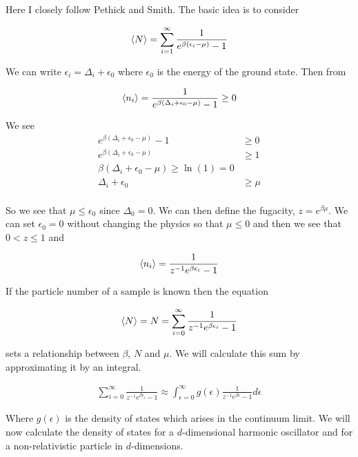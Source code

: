 \documentclass[12pt]{article}
\newcommand{\ep}{\epsilon}
\begin{document}
Here I closely follow Pethick and Smith. The basic idea is to consider

\begin{align}
\Braket{N} = \sum_{i=1}^{\infty} \frac{1}{e^{\beta(\ep_i-\mu)}-1}
\end{align}

We can write $\ep_i = \Delta_i + \ep_0$ where $\ep_0$ is the energy of the ground state. Then from

\begin{align}
\braket{n_i} = \frac{1}{e^{\beta(\Delta_i + \ep_0 - \mu)}-1} \ge 0
\end{align}

We see 
\begin{align}
e^{\beta(\Delta_i+\ep_0-\mu)}-1 &\ge 0\\
e^{\beta(\Delta_i+\ep_0-\mu)} &\ge 1\\
\beta(\Delta_i+\ep_0-\mu) \ge \ln(1) = 0\\
\Delta_i + \ep_0  &\ge \mu\\
\end{align}

So we see that $\mu \le \ep_0$ since $\Delta_0=0$. We can then define the fugacity, $z = e^{\beta \mu}$. We can set $\ep_0 = 0$ without changing the physics so that $\mu\le 0$ and then we see that $0<z \le 1$ and

\begin{align}
\braket{n_i} = \frac{1}{z^{-1} e^{\beta\ep_i}-1}
\end{align}

If the particle number of a sample is known then the equation

\begin{align}
\Braket{N} = N = \sum_{i=0}^{\infty} \frac{1}{z^{-1}e^{\beta\ep_i}-1}
\end{align}

sets a relationship between $\beta$, $N$ and $\mu$. We will calculate this sum by approximating it by an integral.

\begin{align}
\sum_{i=0}^{\infty} \frac{1}{z^{-1}e^{\beta \ep_i} - 1} \approx \int_{\ep=0}^{\infty} g(\ep) \frac{1}{z^{-1}e^{\beta \ep}-1} d\ep
\end{align}

Where $g(\ep)$ is the density of states which arises in the continuum limit. We will now calculate the density of states for a $d$-dimensional harmonic oscillator and for a non-relativistic particle in $d$-dimensions.
\end{document}

